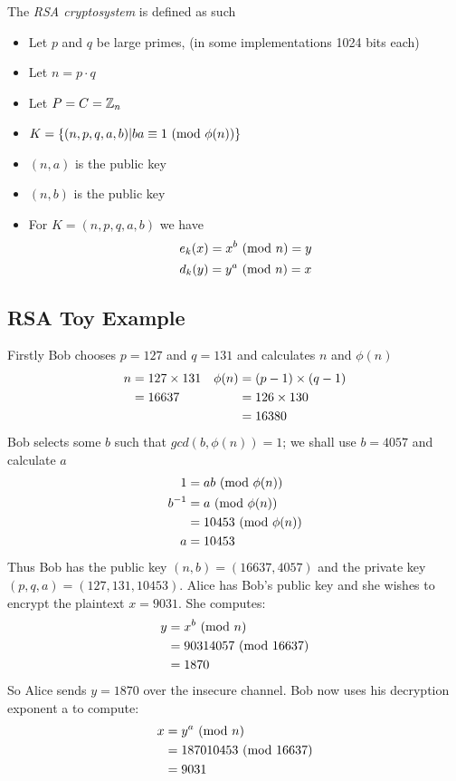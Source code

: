 \begin{definition}
    The \textit{RSA cryptosystem} is defined as such
    \begin{itemize}
        \item Let $p$ and $q$ be large primes, (in some implementations 1024 bits each)
        \item Let $n = p \cdot q$
        \item Let $P = C = \mathbb{Z}_n$
        \item $K = \{(n,p,q,a,b) | ba \equiv 1 \ (\mathrm{mod}\ \phi(n))\}$
        \item $(n,a)$ is the public key
        \item $(n,b)$ is the public key
        \item For $K = (n,p,q,a,b)$ we have
            $$e_k(x) = x^b \ (\mathrm{mod}\ n) = y$$
            $$d_k(y) = y^a \ (\mathrm{mod}\ n) = x$$
    \end{itemize}
\end{definition}

\subsection{RSA Toy Example}
Firstly Bob chooses $p = 127$ and $q = 131$ and calculates $n$ and $\phi(n)$
\begin{align*}
    n &= 127  \times 131  &\phi(n) &= (p - 1) \times (q - 1)\\
      &= 16637            &        &= 126        \times 130       \\
      &                   &        &= 16380
\end{align*}
Bob selects some $b$ such that $gcd(b, \phi(n)) = 1$;
we shall use $b = 4057$ and calculate $a$
\begin{align*}
    1      &= ab \ (\mathrm{mod}\ \phi(n))\\
    b^{-1} &= a \ (\mathrm{mod}\ \phi(n))\\
           &= 10453 \ (\mathrm{mod}\ \phi(n))\\
         a &= 10453
\end{align*}
Thus Bob has the public key $(n,b) = (16637,4057)$ and the private key $(p,q,a) = (127, 131, 10453)$.
Alice has Bob’s public key and she wishes to encrypt the plaintext $x = 9031$.
She computes:
\begin{align*}
   y &= x^b \ (\mathrm{mod}\ n) \\
     &= 90314057 \ (\mathrm{mod}\ 16637) \\
     &= 1870
\end{align*}
So Alice sends $y = 1870$ over the insecure channel. Bob now uses his decryption exponent a to compute:
\begin{align*}
   x &= y^a \ (\mathrm{mod}\ n) \\
     &= 187010453 \ (\mathrm{mod}\ 16637) \\
     &= 9031
\end{align*}

